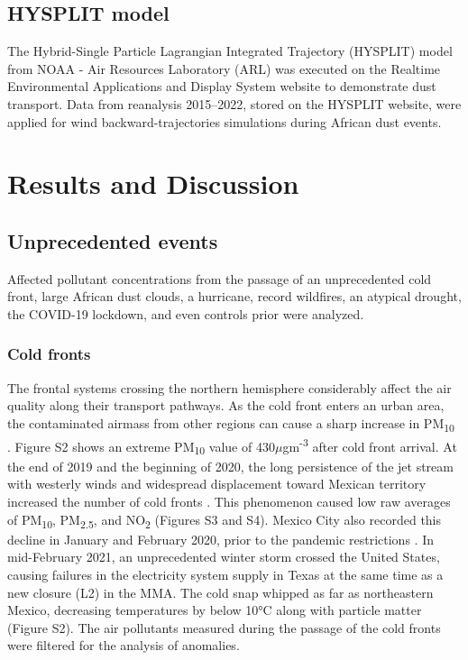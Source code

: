\documentclass[sn-mathphys-num]{sn-jnl}
\begin{document}
\subsection{HYSPLIT model}
The Hybrid-Single Particle Lagrangian Integrated Trajectory (HYSPLIT) model from NOAA - Air Resources Laboratory (ARL) \citep{Stein_2015} was executed on the Realtime Environmental Applications and Display System website to demonstrate dust transport. Data from reanalysis 2015–2022, stored on the HYSPLIT website, were applied for wind backward-trajectories simulations during African dust events.
\section{Results and Discussion}
\subsection{Unprecedented events}
Affected pollutant concentrations from the passage of an unprecedented cold front, large African dust clouds, a hurricane, record wildfires, an atypical drought, the COVID-19 lockdown, and even controls prior were analyzed.
\subsubsection{Cold fronts}
The frontal systems crossing the northern hemisphere considerably affect the air quality along their transport pathways. As the cold front enters an urban area, the contaminated airmass from other regions can cause a sharp increase in PM\textsubscript{10} \citep{Kang_2019}. Figure S2 shows an extreme PM\textsubscript{10} value of 430$\mu$gm\textsuperscript{-3} after cold front arrival. At the end of 2019 and the beginning of 2020, the long persistence of the jet stream with westerly winds and widespread displacement toward Mexican territory increased the number of cold fronts \citep{yucatn}. This phenomenon caused low raw averages of PM\textsubscript{10}, PM\textsubscript{2.5}, and NO\textsubscript{2} (Figures S3 and S4). Mexico City also recorded this decline in January and February 2020, prior to the pandemic restrictions \citep{Vega_2021}. In mid-February 2021, an unprecedented winter storm crossed the United States, causing failures in the electricity system supply in Texas \citep{Doss_Gollin_2021,years} at the same time as a new closure (L2) in the MMA. The cold snap whipped as far as northeastern Mexico, decreasing temperatures by below 10°C along with particle matter (Figure S2). The air pollutants measured during the passage of the cold fronts were filtered for the analysis of anomalies.
\end{document}
